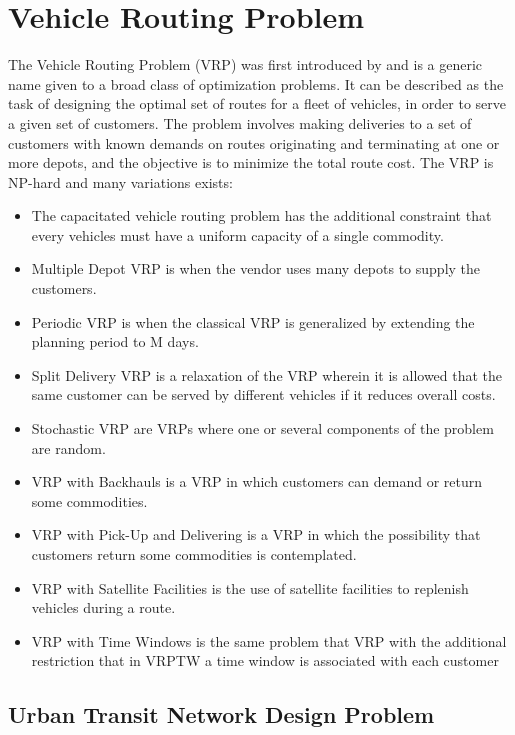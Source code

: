 \section{Vehicle Routing Problem}
The Vehicle Routing Problem (VRP) was first introduced by \citet{dantzig59} and is a generic name given to a broad class of optimization problems. It can be described as the task of designing the optimal set of routes for a fleet of vehicles, in order to serve a given set of customers. The problem involves making deliveries to a set of customers with known demands on routes originating and terminating at one or more depots, and the objective is to minimize the total route cost. The VRP is NP-hard and many variations exists:
\begin{itemize}
\item The capacitated vehicle routing problem has the additional constraint that every vehicles must have a uniform capacity of a single commodity.
\item Multiple Depot VRP is when the vendor uses many depots to supply the customers.
\item Periodic VRP is when the classical VRP is generalized by extending the planning period to M days.
\item Split Delivery VRP is a relaxation of the VRP wherein it is allowed that the same customer can be served by different vehicles if it reduces overall costs. 
\item Stochastic VRP are VRPs where one or several components of the problem are random.
\item VRP with Backhauls is a VRP in which customers can demand or return some commodities.
\item VRP with Pick-Up and Delivering is a VRP in which the possibility that customers return some commodities is contemplated.
\item VRP with Satellite Facilities is the use of satellite facilities to replenish vehicles during a route.
\item VRP with Time Windows is the same problem that VRP with the additional restriction that in VRPTW a time window is associated with each customer
\end{itemize}
\citep{website:neo}


\subsection{Urban Transit Network Design Problem}


